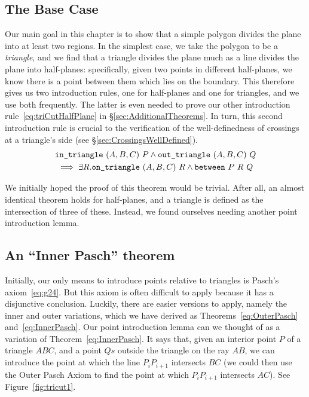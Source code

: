 \subsection{The Base Case}
Our main goal in this chapter is to show that a simple polygon divides the plane into at least two regions. In the simplest case, we take the polygon to be a \emph{triangle}, and we find that a triangle divides the plane much as a line divides the plane into half-planes: specifically, given two points in different half-planes, we know there is a point between them which lies on the boundary. This therefore gives us two introduction rules, one for half-planes and one for triangles, and we use both frequently. The latter is even needed to prove our other introduction rule~\eqref{eq:triCutHalfPlane} in \S\ref{sec:AdditionalTheorems}. In turn, this second introduction rule is crucial to the verification of the well-definedness of crossings at a triangle's side (see \S\ref{sec:CrossingsWellDefined}). 
\begin{multline}\label{eq:baseCase}
\texttt{in\_triangle}\ (A,B,C)\ P \wedge \texttt{out\_triangle}\ (A,B,C)\ Q \\\implies \exists R. \texttt{on\_triangle}\ (A,B,C)\ R \wedge \texttt{between}\ P\ R\ Q
\end{multline}

We initially hoped the proof of this theorem would be trivial. After all, an almost identical theorem holds for half-planes, and a triangle is defined as the intersection of three of these. Instead, we found ourselves needing another point introduction lemma.

\subsection{An ``Inner Pasch'' theorem}
Initially, our only means to introduce points relative to triangles is Pasch's axiom~\eqref{eq:g24}. But this axiom is often difficult to apply because it has a disjunctive conclusion. Luckily, there are easier versions to apply, namely the inner and outer variations, which we have derived as Theorems~\ref{eq:OuterPasch} and~\ref{eq:InnerPasch}. Our point introduction lemma can we thought of as a variation of Theorem~\ref{eq:InnerPasch}. It says that, given an interior point $P$ of a triangle $ABC$, and a point $Qs$ outside the triangle on the ray $AB$, we can introduce the point at which the line $P_iP_{i+1}$ intersects $BC$ (we could then use the Outer Pasch Axiom to find the point at which $P_iP_{i+1}$ intersects $AC$). See Figure~\ref{fig:tricut1}.

